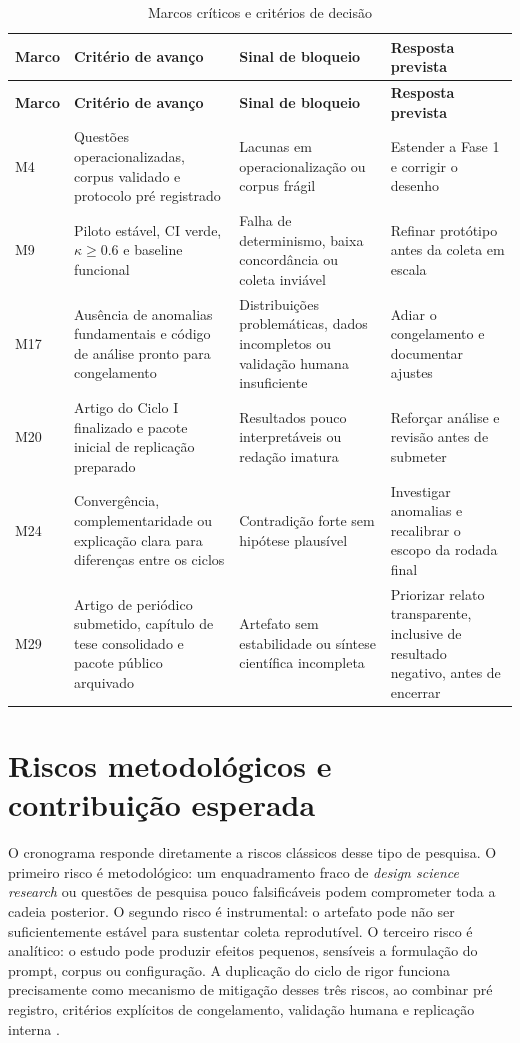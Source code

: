\documentclass[12pt,a4paper]{article}
\begin{document}
\begin{longtable}{>{\raggedright\arraybackslash}p{2.0cm} >{\raggedright\arraybackslash}p{4.2cm} >{\raggedright\arraybackslash}p{4.2cm} >{\raggedright\arraybackslash}p{4.2cm}}
\caption{Marcos críticos e critérios de decisão}\label{tab:marcos} \\
\toprule
\textbf{Marco} & \textbf{Critério de avanço} & \textbf{Sinal de bloqueio} & \textbf{Resposta prevista} \\
\midrule
\endfirsthead

\toprule
\textbf{Marco} & \textbf{Critério de avanço} & \textbf{Sinal de bloqueio} & \textbf{Resposta prevista} \\
\midrule
\endhead

M4 & Questões operacionalizadas, corpus validado e protocolo pré registrado & Lacunas em operacionalização ou corpus frágil & Estender a Fase 1 e corrigir o desenho \\
M9 & Piloto estável, CI verde, $\kappa \geq 0.6$ e baseline funcional & Falha de determinismo, baixa concordância ou coleta inviável & Refinar protótipo antes da coleta em escala \\
M17 & Ausência de anomalias fundamentais e código de análise pronto para congelamento & Distribuições problemáticas, dados incompletos ou validação humana insuficiente & Adiar o congelamento e documentar ajustes \\
M20 & Artigo do Ciclo I finalizado e pacote inicial de replicação preparado & Resultados pouco interpretáveis ou redação imatura & Reforçar análise e revisão antes de submeter \\
M24 & Convergência, complementaridade ou explicação clara para diferenças entre os ciclos & Contradição forte sem hipótese plausível & Investigar anomalias e recalibrar o escopo da rodada final \\
M29 & Artigo de periódico submetido, capítulo de tese consolidado e pacote público arquivado & Artefato sem estabilidade ou síntese científica incompleta & Priorizar relato transparente, inclusive de resultado negativo, antes de encerrar \\
\bottomrule
\end{longtable}

\section{Riscos metodológicos e contribuição esperada}

O cronograma responde diretamente a riscos clássicos desse tipo de pesquisa. O primeiro risco é metodológico: um enquadramento fraco de \textit{design science research} ou questões de pesquisa pouco falsificáveis podem comprometer toda a cadeia posterior. O segundo risco é instrumental: o artefato pode não ser suficientemente estável para sustentar coleta reprodutível. O terceiro risco é analítico: o estudo pode produzir efeitos pequenos, sensíveis a formulação do prompt, corpus ou configuração. A duplicação do ciclo de rigor funciona precisamente como mecanismo de mitigação desses três riscos, ao combinar pré registro, critérios explícitos de congelamento, validação humana e replicação interna \cite{hevner2004, wohlin2012, basili1986}.
\end{document}
